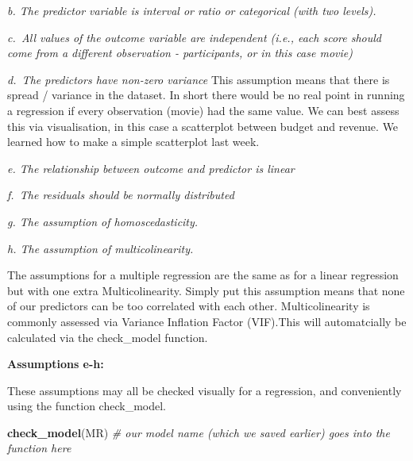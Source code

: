 \documentclass[
]{book}
\newenvironment{Shaded}{\begin{snugshade}}{\end{snugshade}}
\newcommand{\AttributeTok}[1]{\textcolor[rgb]{0.13,0.29,0.53}{#1}}
\newcommand{\CommentTok}[1]{\textcolor[rgb]{0.56,0.35,0.01}{\textit{#1}}}
\newcommand{\FunctionTok}[1]{\textcolor[rgb]{0.13,0.29,0.53}{\textbf{#1}}}
\newcommand{\NormalTok}[1]{#1}
\newcommand{\SpecialCharTok}[1]{\textcolor[rgb]{0.81,0.36,0.00}{\textbf{#1}}}
\begin{document}
\emph{b. The predictor variable is interval or ratio or categorical (with two levels).}

\emph{c.~All values of the outcome variable are independent (i.e., each score should come from a different observation - participants, or in this case movie)}

\emph{d.~The predictors have non-zero variance} This assumption means that there is spread / variance in the dataset. In short there would be no real point in running a regression if every observation (movie) had the same value. We can best assess this via visualisation, in this case a scatterplot between budget and revenue. We learned how to make a simple scatterplot last week.

\begin{Shaded}
\end{Shaded}

\emph{e. The relationship between outcome and predictor is linear}

\emph{f.~The residuals should be normally distributed}

\emph{g. The assumption of homoscedasticity.}

\emph{h. The assumption of multicolinearity.}

The assumptions for a multiple regression are the same as for a linear regression but with one extra Multicolinearity. Simply put this assumption means that none of our predictors can be too correlated with each other. Multicolinearity is commonly assessed via Variance Inflation Factor (VIF).This will automatcially be calculated via the check\_model function.

\textbf{Assumptions e-h:}

These assumptions may all be checked visually for a regression, and conveniently using the function check\_model.

\begin{Shaded}
\begin{Highlighting}[]
\FunctionTok{check\_model}\NormalTok{(MR) }\CommentTok{\# our model name (which we saved earlier) goes into the function here}
\end{Highlighting}
\end{Shaded}
\end{document}
